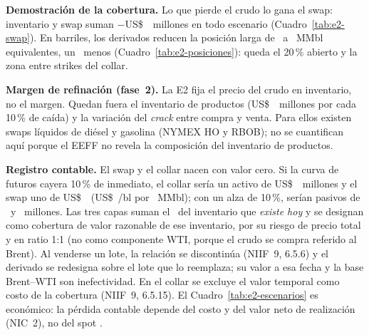 \medskip\noindent
\begin{minipage}[t]{0.5\linewidth}\footnotesize\setlength{\tabcolsep}{2.5pt}\end{minipage}\hfill
\begin{minipage}[t]{0.47\linewidth}\footnotesize\setlength{\tabcolsep}{2.5pt}\end{minipage}
\medskip

\textbf{Demostración de la cobertura.} Lo que pierde el crudo lo gana el swap: inventario y swap suman
$-$US\$~\CostoSwap\ millones en todo escenario (Cuadro~\ref{tab:e2-swap}). En barriles, los derivados reducen la
posición larga de \InvCrudoMMbl\ a \PosGlobalMMbl\ MMbl equivalentes, un \PosReduccionPct\ menos
(Cuadro~\ref{tab:e2-posiciones}): queda el 20\,\% abierto y la zona entre strikes del collar.

\textbf{Margen de refinación (fase~2).} La E2 fija el precio del crudo en inventario, no el margen. Quedan fuera el
inventario de productos (US\$~\PerdidaInvProdDiez\ millones por cada 10\,\% de caída) y la variación del \emph{crack}
entre compra y venta. Para ellos existen swaps líquidos de diésel y gasolina (NYMEX HO y RBOB); no se
cuantifican aquí porque el EEFF no revela la composición del inventario de productos.

\textbf{Registro contable.} El swap y el collar nacen con valor cero. Si la curva de futuros cayera 10\,\% de
inmediato, el collar sería un activo de US\$~\CollarValMenosDiez\ millones y el swap uno de US\$~\SwapValDiez\
(US\$~\SwapValBl/bl por \InvSwapMMbl\ MMbl); con un alza de 10\,\%, serían pasivos de \CollarValMasDiez\ y
\SwapValDiez\ millones. Las tres capas suman el \CoberturaCrudoPct\ del inventario que \emph{existe hoy} y se
designan como cobertura de valor razonable de ese inventario, por su riesgo de precio total y en ratio 1:1 (no como
componente WTI, porque el crudo se compra referido al Brent). Al venderse un lote, la relación se discontinúa
(NIIF~9, 6.5.6) y el derivado se redesigna sobre el lote que lo reemplaza; su valor a esa fecha y la base Brent--WTI
son inefectividad. En el collar se excluye el valor temporal como costo de la cobertura (NIIF~9, 6.5.15). El
Cuadro~\ref{tab:e2-escenarios} es económico:
la pérdida contable depende del costo y del valor neto de realización (NIC~2), no del spot \parencite{ifrs9}.

